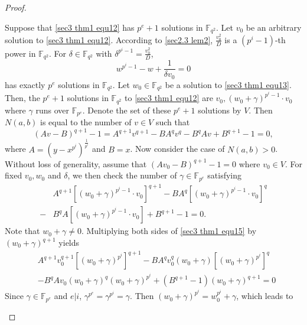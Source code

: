 \documentclass[sn-mathphys-num]{sn-jnl}%
\theoremstyle{thmstyleone}%
\theoremstyle{thmstyletwo}%
\theoremstyle{thmstylethree}%
\begin{document}
\begin{proof}
\begin{enumerate}[label = \bf Case \arabic*:, leftmargin=4.1em]
\begin{enumerate}[label=\bf Case 3.\arabic*:]
			Suppose that \cref{sec3 thm1 equ12} has $p^{e}+1$ solutions in $\mathbb{F}_{q^2}$. Let $v_0$ be an arbitrary solution to \cref{sec3 thm1 equ12}. According to \cref{sec2.3 lem2},  $\frac{v_{0}^{2}}{D}$ is a $(p^i-1)$-th power in $\mathbb{F}_{q^2}$. For $\delta\in\mathbb{F}_{q^2}$ with $\delta^{p^i-1}=\frac{v_{0}^{2}}{D}$,
			\begin{equation}\label{sec3 thm1 equ13}
				w^{p^i-1}-w+\frac{1}{\delta v_0}=0
			\end{equation}
			has exactly $p^e$ solutions in $\mathbb{F}_{q^2}$. Let $w_0\in\mathbb{F}_{q^2}$ be a solution to \cref{sec3 thm1 equ13}. Then, the $p^e+1$ solutions in $\mathbb{F}_{q^2}$ to \cref{sec3 thm1 equ12} are $v_0,(w_0+\gamma)^{p^i-1}\cdot v_0$ where $\gamma$ runs over $\mathbb{F}_{p^e}$. Denote the set of these $p^e+1$ solutions by $V$. Then $N(a,b)$ is equal to the number of $v \in V$ such that 
			\begin{equation}
				\label{sec3 thm1 equ14}
				(Av-B)^{q+1}-1=A^{q+1}v^{q+1}-BA^qv^q-B^qAv+B^{q+1}-1=0,
			\end{equation}
			where $A=\left(y-x^{p^i}\right)^{\frac{1}{p^i}}$ and $B=x$. Now consider the case of $N(a,b)>0$. Without loss of generality, assume that $(Av_0-B)^{q+1}-1=0$ where $v_0 \in V$. For fixed $v_0,w_0$ and $\delta$, we then check the number of $\gamma\in\mathbb{F}_{p^e}$ satisfying
			\begin{equation}\label{sec3 thm1 equ15}
				\begin{aligned}
					&A^{q+1}\left[(w_0+\gamma)^{p^i-1}\cdot v_0\right]^{q+1}-BA^q\left[(w_0+\gamma)^{p^i-1}\cdot v_0\right]^q\\
					-&B^qA\left[(w_0+\gamma)^{p^i-1}\cdot v_0\right]+B^{q+1}-1=0.
				\end{aligned}
			\end{equation}
			Note that $w_0+\gamma\ne 0$. Multiplying both sides of \cref{sec3 thm1 equ15} by $(w_0+\gamma)^{q+1}$ yields
			\begin{equation*}
				\begin{aligned}
					&A^{q+1}v_0^{q+1}\left[(w_0+\gamma)^{p^i}\right]^{q+1}-BA^qv_0^{q}(w_0+\gamma)\left[(w_0+\gamma)^{p^i}\right]^q\\
					&-B^qAv_0(w_0+\gamma)^{q}(w_0+\gamma)^{p^i}+\left(B^{q+1}-1\right)(w_0+\gamma)^{q+1}=0
				\end{aligned}
			\end{equation*}
			Since $\gamma\in\mathbb{F}_{p^e}$ and $e | i$, $\gamma^{p^e}=\gamma^{p^i}=\gamma$. Then $(w_0+\gamma)^{p^i}=w_0^{p^i}+\gamma$, which leads to

\end{enumerate}
\end{enumerate}
\end{proof}
\end{document}
